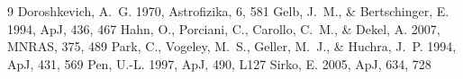 \documentclass[12pt]{article}
\begin{document}
\begin{thebibliography}{9}
 Doroshkevich, A.~G. 1970,
  Astrofizika, 6, 581
 Gelb, J.~M., \& Bertschinger, E.
  1994, ApJ, 436, 467
 Hahn, O., Porciani, C., Carollo, C.~M.,
  \& Dekel, A. 2007, MNRAS, 375, 489
 Park, C., Vogeley, M.~S., Geller, M.~J.,
  \& Huchra, J.~P. 1994, ApJ, 431, 569
 Pen, U.-L. 1997, ApJ, 490, L127
 Sirko, E. 2005, ApJ, 634, 728
\end{thebibliography}
\end{document}

